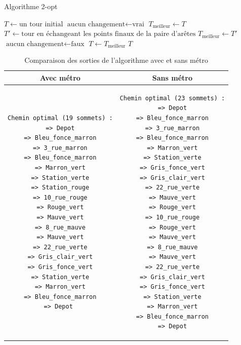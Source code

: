 \documentclass{article}
\begin{document}
\clearpage

\begin{algorithm}[ht]
    \label{algo:2opt}
    \caption{Algorithme 2-opt}
    \begin{algorithmic}
    \State $T \gets \text{un tour initial}$
    \State $\text{aucun changement} \gets \text{vrai}$
    \Repeat
        \State $T_{\text{meilleur}} \gets T$
            \State $T' \gets \text{tour en échangeant les points finaux de la paire d'arêtes}$
                \State $T_{\text{meilleur}} \gets T'$
                \State $\text{aucun changement} \gets \text{faux}$
            \EndIf
        \EndFor
        \State $T \gets T_{\text{meilleur}}$
    \State \Return $T$
\end{algorithmic}
\end{algorithm}

\clearpage

\begin{table}[ht]{}
    \caption{Comparaison des sorties de l'algorithme avec et sans métro}
    \label{fig:chemins}    
    \centering
    \begin{tabular}{|c|c|}
        \hline
        Avec métro & Sans métro \\
        \hline
        \begin{minipage}{6cm}
            \begin{verbatim}
Chemin optimal (19 sommets) :
=> Depot
=> Bleu_fonce_marron
=> 3_rue_marron
=> Bleu_fonce_marron
=> Marron_vert
=> Station_verte
=> Station_rouge
=> 10_rue_rouge
=> Rouge_vert
=> Mauve_vert
=> 8_rue_mauve
=> Mauve_vert
=> 22_rue_verte
=> Gris_clair_vert
=> Gris_fonce_vert
=> Station_verte
=> Marron_vert
=> Bleu_fonce_marron
=> Depot 
            \end{verbatim}
        \end{minipage}
        &
        \begin{minipage}{6cm}
            \begin{verbatim}
Chemin optimal (23 sommets) :
=> Depot
=> Bleu_fonce_marron
=> 3_rue_marron
=> Bleu_fonce_marron
=> Marron_vert
=> Station_verte
=> Gris_fonce_vert
=> Gris_clair_vert
=> 22_rue_verte
=> Mauve_vert
=> Rouge_vert
=> 10_rue_rouge
=> Rouge_vert
=> Mauve_vert
=> 8_rue_mauve
=> Mauve_vert
=> 22_rue_verte
=> Gris_clair_vert
=> Gris_fonce_vert
=> Station_verte
=> Marron_vert
=> Bleu_fonce_marron
=> Depot
            \end{verbatim}
        \end{minipage}
        \\
        \hline
    \end{tabular}
\end{table}
  
\clearpage

\printbibliography
\end{document}
